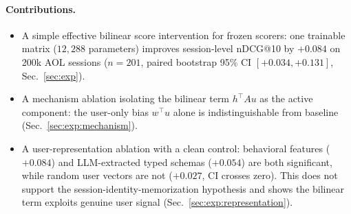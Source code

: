 \paragraph{Contributions.}
\begin{itemize}[leftmargin=*,itemsep=2pt]
\item A simple effective bilinear score intervention for frozen scorers: one trainable matrix ($12{,}288$ parameters) improves session-level nDCG@10 by $+0.084$ on 200k AOL sessions ($n{=}201$, paired bootstrap 95\% CI $[+0.034, +0.131]$, Sec.~\ref{sec:exp}).
\item A mechanism ablation isolating the bilinear term $h^\top A u$ as the active component: the user-only bias $w^\top u$ alone is indistinguishable from baseline (Sec.~\ref{sec:exp:mechanism}).
\item A user-representation ablation with a clean control: behavioral features ($+0.084$) and LLM-extracted typed schemas ($+0.054$) are both significant, while random user vectors are not ($+0.027$, CI crosses zero). This does not support the session-identity-memorization hypothesis and shows the bilinear term exploits genuine user signal (Sec.~\ref{sec:exp:representation}).
\end{itemize}
